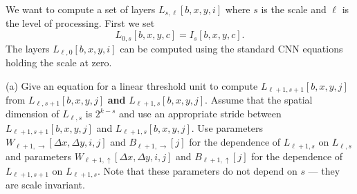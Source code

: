 \documentclass{article}
\begin{document}
We want to compute a set of layers $L_{s,\ell}[b,x,y,i]$ where $s$ is the scale and $\ell$ is the level of processing.  First we set
$$L_{0,s}[b,x,y,c] = I_s[b,x,y,c].$$
The layers $L_{\ell,0}[b,x,y,i]$ can be computed using the standard CNN equations holding the scale at zero.

\medskip
(a) Give an equation for a linear threshold unit to compute $L_{\ell+1,s+1}[b,x,y,j]$ from $L_{\ell,s+1}[b,x,y,j]$ {\bf and} $L_{\ell+1,s}[b,x,y,j]$.  Assume that the
spatial dimension of $L_{\ell,s}$ is $2^{k-s}$ and use an appropriate stride between $L_{\ell+1,s+1}[b,x,y,j]$ and $L_{\ell+1,s}[b,x,y,j]$.  Use parameters
$W_{\ell+1,\rightarrow}[\Delta x, \Delta y, i,j]$ and $B_{\ell+1,\rightarrow}[j]$ for the dependence of $L_{\ell+1,s}$ on $L_{\ell,s}$ and
parameters
$W_{\ell+1,\uparrow}[\Delta x, \Delta y, i,j]$ and $B_{\ell+1,\uparrow}[j]$ for the dependence of $L_{\ell+1,s+1}$ on $L_{\ell+1,s}$.  Note that these parameters do not depend on $s$ ---
they are scale invariant. 
\end{document}
